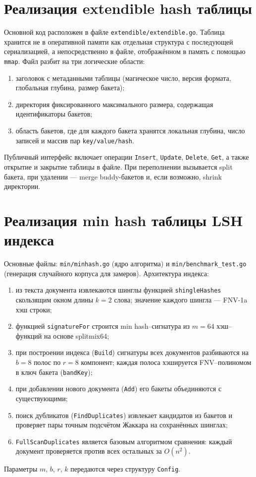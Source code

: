 \documentclass{itmo}
\begin{document}
\section{Реализация extendible hash таблицы}

Основной код расположен в файле \texttt{extendible/extendible.go}.
Таблица хранится не в оперативной памяти как отдельная структура с последующей сериализацией, а непосредственно в файле, отображённом в память с помощью \texttt{mmap}.
Файл разбит на три логические области:
\begin{enumerate}
	\item заголовок с метаданными таблицы (магическое число, версия формата, глобальная глубина, размер бакета);
	\item директория фиксированного максимального размера, содержащая идентификаторы бакетов;
	\item область бакетов, где для каждого бакета хранятся локальная глубина, число записей и массив пар \texttt{key/value/hash}.
\end{enumerate}

Публичный интерфейс включает операции \texttt{Insert}, \texttt{Update}, \texttt{Delete}, \texttt{Get}, а также открытие и закрытие таблицы в файле.
При переполнении вызывается split бакета, при удалении --- merge buddy-бакетов и, если возможно, shrink директории.

\section{Реализация min hash таблицы LSH индекса}

Основные файлы: \texttt{min/minhash.go} (ядро алгоритма) и \texttt{min/benchmark\_test.go} (генерация случайного корпуса для замеров).
Архитектура индекса:
\begin{enumerate}
	\item из текста документа извлекаются шинглы функцией \texttt{shingleHashes} скользящим окном длины $k=2$ слова; значение каждого шингла --- FNV-1a хэш строки;
	\item функцией \texttt{signatureFor} строится min hash--сигнатура из $m=64$ хэш--функций на основе splitmix64;
	\item при построении индекса (\texttt{Build}) сигнатуры всех документов разбиваются на $b=8$ полос по $r=8$ компонент; каждая полоса хэшируется FNV--полиномом в ключ бакета (\texttt{bandKey});
	\item при добавлении нового документа (\texttt{Add}) его бакеты объединяются с существующими;
	\item поиск дубликатов (\texttt{FindDuplicates}) извлекает кандидатов из бакетов и проверяет пары точным подсчётом Жаккара на сохранённых шинглах;
	\item \texttt{FullScanDuplicates} является базовым алгоритмом сравнения: каждый документ проверяется против всех остальных за $O(n^2)$.
\end{enumerate}
Параметры $m$, $b$, $r$, $k$ передаются через структуру \texttt{Config}.
\end{document}
